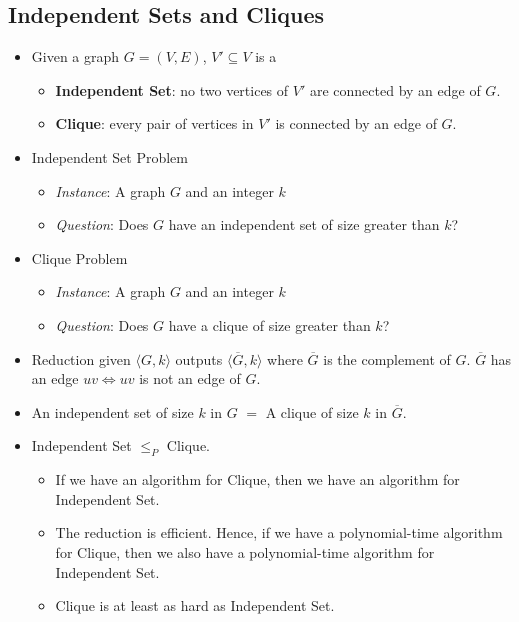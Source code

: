 \subsection{Independent Sets and Cliques}
\begin{itemize}
    \item Given a graph $G = (V, E)$, $V' \subseteq V$ is a
    \begin{itemize}
        \item \textbf{Independent Set}: no two vertices of $V'$ are connected by an edge of $G$.
        \item \textbf{Clique}: every pair of vertices in $V'$ is connected by an edge of $G$.
    \end{itemize}
    \item Independent Set Problem
    \begin{itemize}
        \item \textit{Instance}: A graph $G$ and an integer $k$
        \item \textit{Question}: Does $G$ have an independent set of size greater than $k$?
    \end{itemize}
    \item Clique Problem
    \begin{itemize}
        \item \textit{Instance}: A graph $G$ and an integer $k$
        \item \textit{Question}: Does $G$ have a clique of size greater than $k$?
    \end{itemize}
    \item Reduction given $\langle G, k \rangle$ outputs $\langle \overline{G}, k \rangle$ where $\overline{G}$ is the complement of $G$. $\overline{G}$ has an edge $uv \iff uv$ is not an edge of $G$.
    \item An independent set of size $k$ in $G$ $=$ A clique of size $k$ in $\overline{G}$.
    \item Independent Set $\leq_P$ Clique.
    \begin{itemize}
        \item If we have an algorithm for Clique, then we have an algorithm for Independent Set.
        \item The reduction is efficient. Hence, if we have a polynomial-time algorithm for Clique, then we also have a polynomial-time algorithm for Independent Set.
        \item Clique is at least as hard as Independent Set.
    \end{itemize}

\end{itemize}
